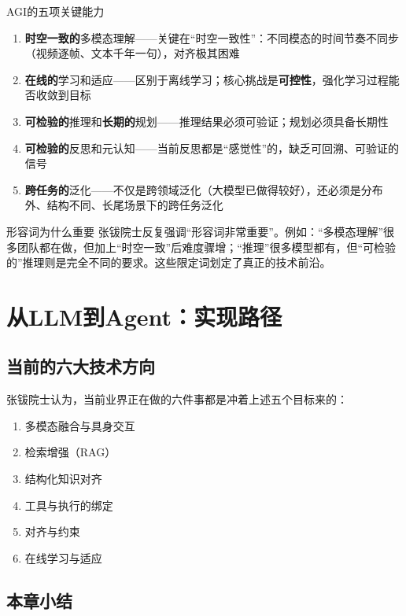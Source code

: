 \documentclass[a4paper]{article}
\begin{document}
\begin{importantbox}{AGI的五项关键能力}
\begin{enumerate}
\item \textbf{时空一致的}多模态理解——关键在``时空一致性''：不同模态的时间节奏不同步（视频逐帧、文本千年一句），对齐极其困难
\item \textbf{在线的}学习和适应——区别于离线学习；核心挑战是\textbf{可控性}，强化学习过程能否收敛到目标
\item \textbf{可检验的}推理和\textbf{长期的}规划——推理结果必须可验证；规划必须具备长期性
\item \textbf{可检验的}反思和元认知——当前反思都是``感觉性''的，缺乏可回溯、可验证的信号
\item \textbf{跨任务的}泛化——不仅是跨领域泛化（大模型已做得较好），还必须是分布外、结构不同、长尾场景下的跨任务泛化
\end{enumerate}
\end{importantbox}

\begin{knowledgebox}{形容词为什么重要}
张钹院士反复强调``形容词非常重要''。例如：``多模态理解''很多团队都在做，但加上``时空一致''后难度骤增；``推理''很多模型都有，但``可检验的''推理则是完全不同的要求。这些限定词划定了真正的技术前沿。
\end{knowledgebox}


\section{从LLM到Agent：实现路径}

\subsection{当前的六大技术方向}

张钹院士认为，当前业界正在做的六件事都是冲着上述五个目标来的：

\begin{enumerate}
\item 多模态融合与具身交互
\item 检索增强（RAG）
\item 结构化知识对齐
\item 工具与执行的绑定
\item 对齐与约束
\item 在线学习与适应
\end{enumerate}

\subsection{本章小结}
\end{document}
